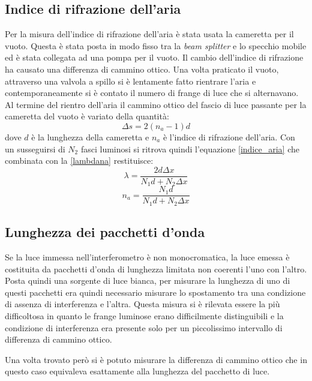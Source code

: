\documentclass[a4paper,11pt]{article}
\begin{document}
	\subsection{Indice di rifrazione dell'aria}
	Per la misura dell'indice di rifrazione dell'aria è stata usata la cameretta per il vuoto. Questa è stata posta in modo fisso tra la \emph{beam splitter} e lo specchio mobile ed è stata collegata ad una pompa per il vuoto. Il cambio dell'indice di rifrazione ha causato una differenza di cammino ottico. Una volta praticato il vuoto, attraverso una valvola a spillo si è lentamente fatto rientrare l'aria e contemporaneamente si è contato il numero di frange di luce che si alternavano. Al termine del rientro dell'aria il cammino ottico del fascio di luce passante per la cameretta del vuoto è variato della quantità:
	\begin{equation}\label{deltavuoto}
		\Delta s = 2(n_a-1)d
	\end{equation}
	dove $ d $ è la lunghezza della cameretta e $ n_a $ è l'indice di rifrazione dell'aria. Con un susseguirsi di $ N_2 $ fasci luminosi si ritrova quindi l'equazione \ref{indice_aria} che combinata con la \ref{lambdana} restituisce:
	\begin{equation}\label{lambda}
		\lambda=\dfrac{2d\Delta x}{N_1 d + N_2 \Delta x}
	\end{equation}
	\begin{equation}\label{na}
		n_a=\dfrac{N_1 d}{N_1 d + N_2 \Delta x}
	\end{equation}
	
	\subsection{Lunghezza dei pacchetti d'onda}
	Se la luce immessa nell'interferometro è non monocromatica, la luce emessa è costituita da pacchetti d'onda di lunghezza limitata non coerenti l'uno con l'altro. Posta quindi una sorgente di luce bianca, per misurare la lunghezza di uno di questi pacchetti era quindi necessario misurare lo spostamento tra una condizione di assenza di interferenza e l'altra. Questa misura si è rilevata essere la più difficoltosa in quanto le frange luminose erano difficilmente distinguibili e la condizione di interferenza era presente solo per un piccolissimo intervallo di differenza di cammino ottico.
	
	Una volta trovato però si è potuto misurare la differenza di cammino ottico che in questo caso equivaleva esattamente alla lunghezza del pacchetto di luce. 
	
\end{document}
